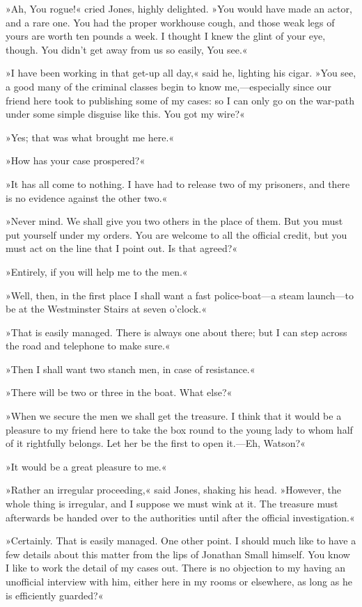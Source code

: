 »Ah, You rogue!« cried Jones, highly delighted. »You would have made an actor, and a rare one. You had the proper workhouse cough, and those weak legs of yours are worth ten pounds a week. I thought I knew the glint of your eye, though. You didn't get away from us so easily, You see.«

»I have been working in that get-up all day,« said he, lighting his cigar. »You see, a good many of the criminal classes begin to know me,—especially since our friend here took to publishing some of my cases: so I can only go on the war-path under some simple disguise like this. You got my wire?«

»Yes; that was what brought me here.«

»How has your case prospered?«

»It has all come to nothing. I have had to release two of my prisoners, and there is no evidence against the other two.«

»Never mind. We shall give you two others in the place of them. But you must put yourself under my orders. You are welcome to all the official credit, but you must act on the line that I point out. Is that agreed?«

»Entirely, if you will help me to the men.«

»Well, then, in the first place I shall want a fast police-boat—a steam launch—to be at the Westminster Stairs at seven o'clock.«

»That is easily managed. There is always one about there; but I can step across the road and telephone to make sure.«

»Then I shall want two stanch men, in case of resistance.«

»There will be two or three in the boat. What else?«

»When we secure the men we shall get the treasure. I think that it would be a pleasure to my friend here to take the box round to the young lady to whom half of it rightfully belongs. Let her be the first to open it.—Eh, Watson?«

»It would be a great pleasure to me.«

»Rather an irregular proceeding,« said Jones, shaking his head. »However, the whole thing is irregular, and I suppose we must wink at it. The treasure must afterwards be handed over to the authorities until after the official investigation.«

»Certainly. That is easily managed. One other point. I should much like to have a few details about this matter from the lips of Jonathan Small himself. You know I like to work the detail of my cases out. There is no objection to my having an unofficial interview with him, either here in my rooms or elsewhere, as long as he is efficiently guarded?«

